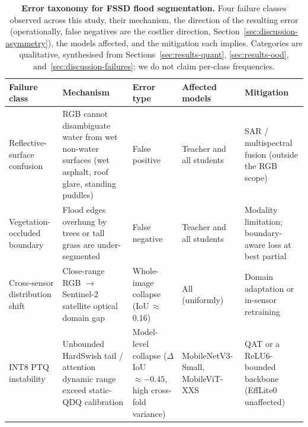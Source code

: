\begin{table}[ht]
\centering
\caption{\textbf{Error taxonomy for FSSD flood segmentation.} Four failure classes observed across this study, their mechanism, the direction of the resulting error (operationally, false negatives are the costlier direction, Section~\ref{sec:discussion-asymmetry}), the models affected, and the mitigation each implies. Categories are qualitative, synthesised from Sections~\ref{sec:results-quant}, \ref{sec:results-ood}, and~\ref{sec:discussion-failures}; we do not claim per-class frequencies.}
\label{tab:t8-taxonomy}
\small
\setlength{\tabcolsep}{4pt}
\begin{tabular}{p{2.6cm}p{4.2cm}p{2.1cm}p{2.4cm}p{3.2cm}}
\toprule
\textbf{Failure class} & \textbf{Mechanism} & \textbf{Error type} & \textbf{Affected models} & \textbf{Mitigation} \\
\midrule
Reflective-surface confusion
  & RGB cannot disambiguate water from wet non-water surfaces (wet asphalt, roof glare, standing puddles)
  & False positive
  & Teacher and all students
  & SAR / multispectral fusion (outside the RGB scope) \\
\addlinespace
Vegetation-occluded boundary
  & Flood edges overhung by trees or tall grass are under-segmented
  & False negative
  & Teacher and all students
  & Modality limitation; boundary-aware loss at best partial \\
\addlinespace
Cross-sensor distribution shift
  & Close-range RGB $\rightarrow$ Sentinel-2 satellite optical domain gap
  & Whole-image collapse (IoU\,$\approx$\,0.16)
  & All (uniformly)
  & Domain adaptation or in-sensor retraining \\
\addlinespace
INT8 PTQ instability
  & Unbounded HardSwish tail / attention dynamic range exceed static-QDQ calibration
  & Model-level collapse ($\Delta$IoU\,$\approx-0.45$, high cross-fold variance)
  & MobileNetV3-Small, MobileViT-XXS
  & QAT or a ReLU6-bounded backbone (EffLite0 unaffected) \\
\bottomrule
\end{tabular}
\end{table}

